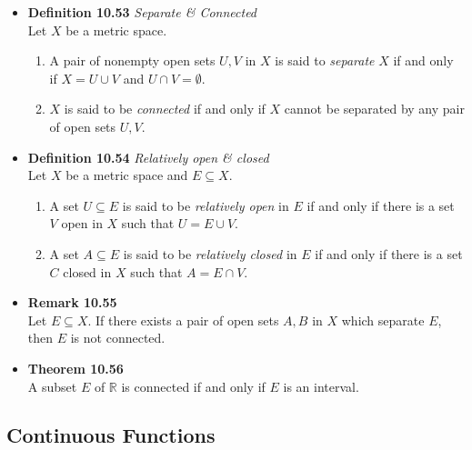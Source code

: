 \documentclass[11pt,a4paper]{article}
\begin{document}
\begin{itemize}
    \item \textbf{Definition 10.53} \emph{Separate \& Connected} \\
        Let $X$ be a metric space.
        \begin{enumerate}
            \item A pair of nonempty open sets $U, V$ in $X$ is said to \emph{separate} $X$
                if and only if $X = U \cup V$ and $U \cap V = \emptyset$.
            \item $X$ is said to be \emph{connected} if and only if $X$ cannot be separated
                by any pair of open sets $U, V$.
        \end{enumerate}

    \item \textbf{Definition 10.54} \emph{Relatively open \& closed} \\
        Let $X$ be a metric space and $E \subseteq X$.
        \begin{enumerate}
            \item A set $U \subseteq E$ is said to be \emph{relatively open} in $E$
                if and only if there is a set $V$ open in $X$ such that $U = E \cup V$.
            \item A set $A \subseteq E$ is said to be \emph{relatively closed} in $E$
                if and only if there is a set $C$ closed in $X$ such that $A = E \cap V$.
        \end{enumerate}

    \item \textbf{Remark 10.55} \\
        Let $E \subseteq X$.
        If there exists a pair of open sets $A, B$ in $X$ which separate $E$,
        then $E$ is not connected.

    \item \textbf{Theorem 10.56} \\
        A subset $E$ of $\mathbb{R}$ is connected if and only if $E$ is an interval.
\end{itemize}

\subsection{Continuous Functions}
\end{document}
